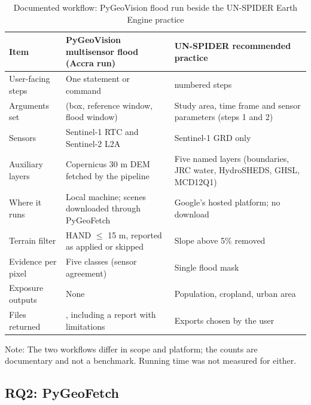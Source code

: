 \documentclass[conference]{IEEEtran}
\newlength{\tabw}
\begin{document}
\begin{table}[!t]
\caption{Documented workflow: PyGeoVision flood run beside the UN-SPIDER Earth Engine practice}
\centering
{\footnotesize\setlength{\tabcolsep}{2.5pt}\renewcommand{\arraystretch}{1.12}\setlength{\tabw}{\dimexpr\textwidth-6\tabcolsep\relax}
\begin{tabular}{>{\raggedright\arraybackslash}p{}>{\raggedright\arraybackslash}p{}>{\raggedright\arraybackslash}p{}}
\toprule
\textbf{Item} & \textbf{PyGeoVision multisensor flood (Accra run)} & \textbf{UN-SPIDER recommended practice \cite{unspider2026flood}} \\
\midrule
User-facing steps & One statement or command & 13 numbered steps \\
Arguments set & 3 (box, reference window, flood window) & Study area, time frame and sensor parameters (steps 1 and 2) \\
Sensors & Sentinel-1 RTC and Sentinel-2 L2A & Sentinel-1 GRD only \\
Auxiliary layers & Copernicus 30 m DEM fetched by the pipeline & Five named layers (boundaries, JRC water, HydroSHEDS, GHSL, MCD12Q1) \\
Where it runs & Local machine; scenes downloaded through PyGeoFetch & Google's hosted platform; no download \\
Terrain filter & HAND $\leq$ 15 m, reported as applied or skipped & Slope above 5\% removed \\
Evidence per pixel & Five classes (sensor agreement) & Single flood mask \\
Exposure outputs & None & Population, cropland, urban area \\
Files returned & 17, including a report with limitations & Exports chosen by the user \\
\bottomrule
\end{tabular}
\par\vspace{2pt}\begin{minipage}{\textwidth}\raggedright\scriptsize Note: The two workflows differ in scope and platform; the counts are documentary and not a benchmark. Running time was not measured for either.\end{minipage}
}
\end{table}

\subsection{RQ2: PyGeoFetch}
\end{document}
